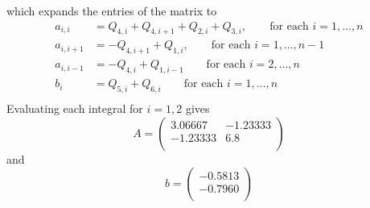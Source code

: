\documentclass[12pt]{article}
\newcommand{\dd}[1]{\mathrm{d}{#1}}
\begin{document}
which expands the entries of the matrix to
\begin{equation}
  \begin{aligned}
    a_{i,i} &= Q_{4,i}+Q_{4,i+1}+Q_{2,i}+Q_{3,i},
    \qquad \text{for each } i=1,\ldots,n \\
    a_{i,i+1} &= -Q_{4,i+1}+Q_{1,i},
    \qquad \text{for each } i=1,\ldots,n-1 \\
    a_{i,i-1} &= -Q_{4,i}+Q_{1,i-1}
    \qquad \text{for each } i=2,\ldots,n \\
    b_{i} &= Q_{5,i}+Q_{6,i} \qquad \text{for each } i=1,\ldots,n \\
  \end{aligned}
\end{equation}
Evaluating each integral for $i=1,2$ gives
\begin{equation}
  \label{eq:2a-matrix}
A=
  \begin{pmatrix}
    3.06667 & -1.23333 \\
    -1.23333 & 6.8 \\
  \end{pmatrix}
\end{equation}
and 
\begin{equation}
  \label{eq:2a-matrix-b}
b=
  \begin{pmatrix}
    -0.5813 \\
    -0.7960\\
  \end{pmatrix}
\end{equation}
\end{document}
